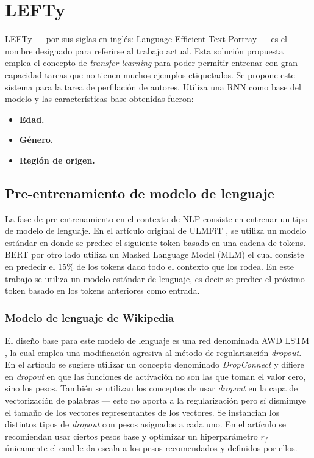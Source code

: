 
\chapter{LEFTy}

\label{Chapter5} %

LEFTy --- por sus siglas en inglés: Language Efficient Text Portray --- es el nombre designado para referirse al trabajo actual. Esta solución propuesta emplea el concepto de \textit{transfer learning} para poder permitir entrenar con gran capacidad tareas que no tienen muchos ejemplos etiquetados. Se propone este sistema para la tarea de perfilación de autores. Utiliza una RNN como base del modelo y las características base obtenidas fueron:

\begin{itemize}
\item \textbf{Edad.}
\item \textbf{Género.}
\item \textbf{Región de origen.}
\end{itemize}

\section{Pre-entrenamiento de modelo de lenguaje}

La fase de pre-entrenamiento en el contexto de NLP consiste en entrenar un tipo de modelo de lenguaje. En el artículo original de ULMFiT \parencite{howard2018}, se utiliza un modelo estándar en donde se predice el siguiente token basado en una cadena de tokens. BERT \parencite{devlin2018bert} por otro lado utiliza un Masked Language Model (MLM) el cual consiste en predecir el 15\% de los tokens dado todo el contexto que los rodea. En este trabajo se utiliza un modelo estándar de lenguaje, es decir se predice el próximo token basado en los tokens anteriores como entrada.

\subsection{Modelo de lenguaje de Wikipedia}

El diseño base para este modelo de lenguaje es una red denominada AWD LSTM \parencite{merityRegOpt}, la cual emplea una modificación agresiva al método de regularización \textit{dropout}. En el artículo se sugiere utilizar un concepto denominado \textit{DropConnect} y difiere en \textit{dropout} en que las funciones de activación no son las que toman el valor cero, sino los pesos. También se utilizan los conceptos de usar \textit{dropout} en la capa de vectorización de palabras --- esto no aporta a la regularización pero sí disminuye el tamaño de los vectores representantes de los vectores. Se instancian los distintos tipos de \textit{dropout} con pesos asignados a cada uno. En el artículo se recomiendan usar ciertos pesos base y optimizar un hiperparámetro $r_f$ únicamente el cual le da escala a los pesos recomendados y definidos por ellos.

